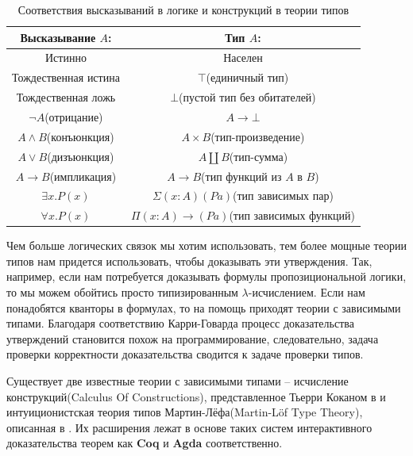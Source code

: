 \begin{table}[H]
  \centering
  \begin{tabular}{| c | c |}
    \hline
    Высказывание $A$: & Тип $A$: \\
    \hline
    Истинно & Населен \\
    \hline
    Тождественная истина & $\top$(единичный тип) \\
    \hline
    Тождественная ложь & $\bot$(пустой тип без обитателей) \\
    \hline
    $\lnot A$(отрицание) & $A \to \bot$ \\
    \hline
    $A \land B$(конъюнкция) & $A \times B$(тип-произведение) \\
    \hline
    $A \lor B$(дизъюнкция) & $A \coprod B$(тип-сумма) \\
    \hline
    $A \to B$(импликация) & $A \to B$(тип функций из $A$ в $B$) \\
    \hline
    $\exists x.P(x)$ & $\Sigma (x : A) (P a)$(тип зависимых пар) \\
    \hline
    $\forall x.P(x)$ & $\Pi (x : A) \to (P a)$(тип зависимых функций) \\
    \hline
  \end{tabular}
  \caption{Соответствия высказываний в логике и конструкций в теории типов}
\end{table}

Чем больше логических связок мы хотим использовать, тем более мощные теории типов  нам придется использовать, чтобы доказывать эти утверждения. Так, например, если нам потребуется доказывать формулы пропозициональной логики, то мы можем обойтись просто типизированным $\lambda$-исчислением. Если нам понадобятся кванторы в формулах, то на помощь приходят теории с зависимыми типами. Благодаря соответствию Карри-Говарда процесс доказательства утверждений становится похож на программирование, следовательно, задача проверки корректности доказательства сводится к задаче проверки типов.

Существует две известные теории с зависимыми типами -- исчисление конструкций(Calculus Of Constructions), представленное Тьерри Коканом в \cite{coquand1988calculus} и интуиционистская теория типов Мартин-Лёфа(Martin-L{\"o}f Type Theory), описанная в \cite{martin1975intuitionistic}. Их расширения лежат в основе таких систем интерактивного доказательства теорем как \textbf{Coq} и \textbf{Agda} соответственно.
